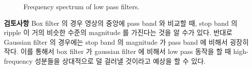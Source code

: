 \documentclass[a4paper, 12p]{paper}
\begin{document}
\begin{figure}[H]
{}
\caption{Frequency spectrum of low pass filters.}\label{fig:impl2_spectrum}
\end{figure}

\textbf{검토사항} Box filter 의 경우 영상의 중앙에 pass band 와 비교할 때, stop band 의 ripple 이 거의 비슷한 수준의 magnitude 를 가진다는 것을 알 수가 있다. 반대로 Gaussian filter 의 경우에는 stop band 의 magnitude 가 pass band 에 비해서 굉장히 작다. 이를 통해서 box filter 가 gaussian filter 에 비해서 low pass 동작을 할 때 high-frequency 성분들을 상대적으로 덜 걸러낼 것이라고 예상을 할 수 있다.
\end{document}
